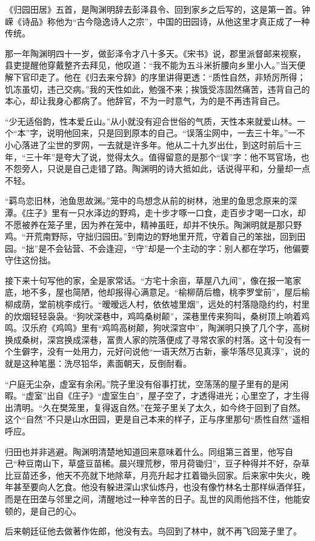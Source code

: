 \begin{appreciation}
《归园田居》五首，是陶渊明辞去彭泽县令、回到家乡之后写的，这是第一首。钟嵘《诗品》称他为“古今隐逸诗人之宗”，中国的田园诗，从他这里才真正成了一种传统。

那一年陶渊明四十一岁，做彭泽令才八十多天。《宋书》说，郡里派督邮来视察，县吏提醒他穿戴整齐去拜见，他叹道：“我不能为五斗米折腰向乡里小人。”当天便解下官印走了。他在《归去来兮辞》的序里讲得更透：“质性自然，非矫厉所得；饥冻虽切，违己交病。”我的天性如此，勉强不来；挨饿受冻固然痛苦，违背自己的本心，却让我身心都病了。他辞官，不为一时意气，为的是不再违背自己。

“少无适俗韵，性本爱丘山。”从小就没有迎合世俗的气质，天性本来就爱山林。一个“本”字，说明他回来，只是回到原本的自己。“误落尘网中，一去三十年。”一不小心落进了尘世的罗网，一去就是许多年。他从二十九岁出仕，到这时前后十三年，“三十年”是夸大了说，觉得太久。值得留意的是那个“误”字：他不骂官场，也不怨旁人，只说是自己走错了路。陶渊明的诗大抵如此，话说得平和，分量却一点不轻。

“羁鸟恋旧林，池鱼思故渊。”笼中的鸟想念从前的树林，池里的鱼思念原来的深潭。《庄子》里有一只水泽边的野鸡，走十步才啄一口食，走百步才喝一口水，却不愿被养在笼子里，因为养在笼中，精神虽旺，却并不快乐。陶渊明就是那只野鸡。“开荒南野际，守拙归园田。”到南边的野地里开荒，守着自己的笨拙，回到田园。“拙”是不会钻营、不会逢迎，“守”却是一个主动的字：别人都在学巧，他偏要守住这份拙。

接下来十句写他的家，全是家常话。“方宅十余亩，草屋八九间”，像在报一笔家底，地不多，屋也简陋，他却报得心满意足。“榆柳荫后檐，桃李罗堂前”，屋后榆柳成荫，堂前桃李成行。“暧暧远人村，依依墟里烟”，远处的村落隐隐约约，村里的炊烟轻轻袅袅。“狗吠深巷中，鸡鸣桑树颠”，深巷里传来狗叫，桑树顶上响着鸡鸣。汉乐府《鸡鸣》里有“鸡鸣高树颠，狗吠深宫中”，陶渊明只换了几个字，高树换成桑树，深宫换成深巷，富贵人家的院落便成了寻常农家的村落。这十句没有一个生僻字，没有一处用力，元好问说他“一语天然万古新，豪华落尽见真淳”，说的就是这种笔墨：洗尽铅华，素面朝天，反倒耐看。

“户庭无尘杂，虚室有余闲。”院子里没有俗事打扰，空荡荡的屋子里有的是闲暇。“虚室”出自《庄子》“虚室生白”，屋子空了，才透得进光；心里空了，才生得出清明。“久在樊笼里，复得返自然。”在笼子里关了太久，如今终于回到了自然。这个“自然”不只是山水田园，更是自己本来的样子，正与序里那句“质性自然”遥相呼应。

归田也并非逃避。陶渊明清楚地知道回来意味着什么。同组第三首里，他写自己“种豆南山下，草盛豆苗稀。晨兴理荒秽，带月荷锄归”，豆子种得并不好，杂草比豆苗还多，他天不亮就下地除草，月亮升起才扛着锄头回家。后来家中失火，晚年甚至要向人乞食。他没有躲进深山求仙炼丹，也没有像竹林名士那样纵酒佯狂，而是在田垄与邻里之间，清醒地过一种辛苦的日子。乱世的风雨他挡不住，他能安顿的，是自己的心。

后来朝廷征他去做著作佐郎，他没有去。鸟回到了林中，就不再飞回笼子里了。
\end{appreciation}
